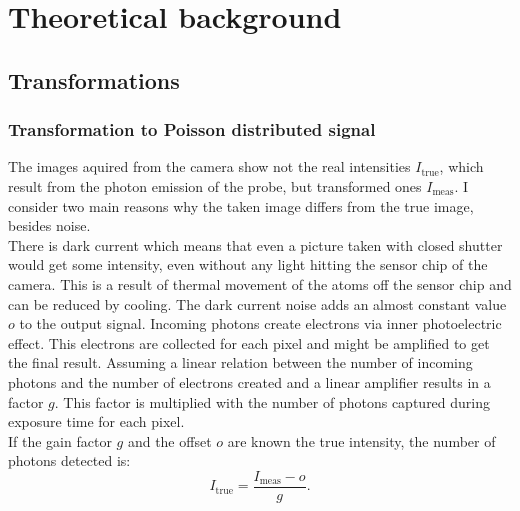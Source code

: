 \chapter{Theoretical background}

\section{Transformations}
\subsection{Transformation to Poisson distributed signal} \label{trafoPoiss}
The images aquired from the camera show not the real intensities
$I_\text{true}$, which result from the photon emission of the probe, but
transformed ones $I_\text{meas}$. I consider two main reasons why the taken image
differs from the true image, besides noise.\\
There is dark current which means that even a picture taken with closed shutter
would get some intensity, even without any light hitting the sensor chip of the
camera. This is a result of thermal movement of the atoms off the sensor chip
and can be reduced by cooling. The dark current noise adds an almost constant
value $o$ to the output signal.
Incoming photons create electrons via inner photoelectric effect. This electrons
are collected for each pixel and might be amplified to get the final result.
Assuming a linear relation between the number of incoming photons and the number
of electrons created and a linear amplifier results in a factor $g$. This factor
is multiplied with the number of photons captured during exposure time for each
pixel.\\
If the gain factor $g$ and the offset $o$ are known the true intensity, the
number of photons detected is:
\begin{equation}
	I_\text{true} = \dfrac{I_\text{meas}-o}{g}.
\end{equation}

